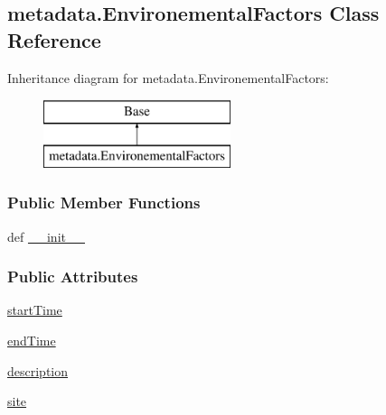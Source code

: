 \hypertarget{classmetadata_1_1EnvironementalFactors}{\subsection{metadata.\-Environemental\-Factors Class Reference}
\label{classmetadata_1_1EnvironementalFactors}
}
Inheritance diagram for metadata.\-Environemental\-Factors\-:\begin{figure}[H]
\begin{center}
\leavevmode
\includegraphics[height=2.000000cm]{classmetadata_1_1EnvironementalFactors}
\end{center}
\end{figure}
\subsubsection*{Public Member Functions}
\begin{DoxyCompactItemize}
\item 
def \hyperlink{classmetadata_1_1EnvironementalFactors_af3c8720509a7bc9b2a610870d6aa7393}{\-\_\-\-\_\-init\-\_\-\-\_\-}
\end{DoxyCompactItemize}
\subsubsection*{Public Attributes}
\begin{DoxyCompactItemize}
\item 
\hyperlink{classmetadata_1_1EnvironementalFactors_a06cee8a6fd4c3ef2d4e9efd6e3361693}{start\-Time}
\item 
\hyperlink{classmetadata_1_1EnvironementalFactors_a12176448537de9e783ce7338fa601afb}{end\-Time}
\item 
\hyperlink{classmetadata_1_1EnvironementalFactors_a8a36643a488632dba000e1a4b62c7c63}{description}
\item 
\hyperlink{classmetadata_1_1EnvironementalFactors_a131e9008b6c7ea2a1db5bc8711035a64}{site}
\end{DoxyCompactItemize}
